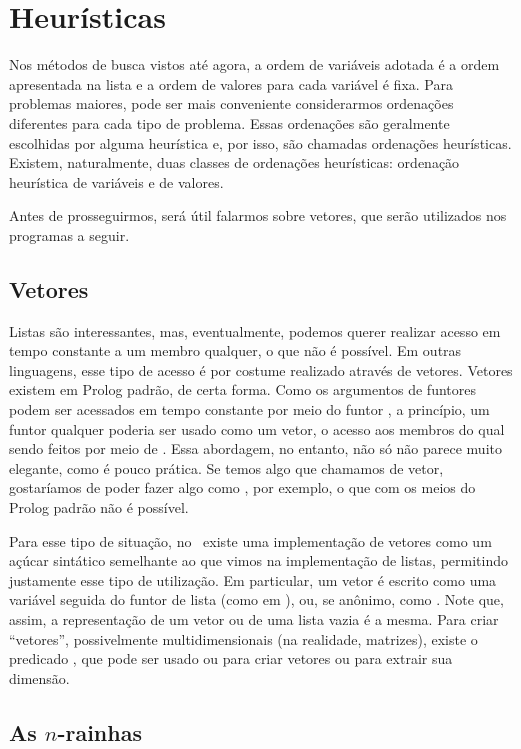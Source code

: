 \documentclass{article}
\begin{document}
\section{Heurísticas}

Nos métodos de busca vistos até agora, a ordem de variáveis adotada é a ordem apresentada na lista
e a ordem de valores para cada variável é fixa. Para problemas maiores, pode ser mais conveniente
considerarmos ordenações diferentes para cada tipo de problema. Essas ordenações são geralmente
escolhidas por alguma heurística e, por isso, são chamadas ordenações heurísticas. Existem,
naturalmente, duas classes de ordenações heurísticas: ordenação heurística de variáveis e de
valores.

Antes de prosseguirmos, será útil falarmos sobre vetores, que serão utilizados nos programas a
seguir.

\subsection{Vetores}

Listas são interessantes, mas, eventualmente, podemos querer realizar acesso em tempo constante a
um membro qualquer, o que não é possível. Em outras linguagens, esse tipo de acesso é por costume
realizado através de vetores. Vetores existem em Prolog padrão, de certa forma. Como os argumentos
de funtores podem ser acessados em tempo constante por meio do funtor , a princípio,
um funtor qualquer poderia ser usado como um vetor, o acesso aos membros do qual sendo feitos por meio de
. Essa abordagem, no entanto, não só não parece muito elegante, como é pouco prática.
Se temos algo que chamamos de vetor, gostaríamos de poder fazer algo como , por
exemplo, o que com os meios do Prolog padrão não é possível.

Para esse tipo de situação, no \eclipse\ existe uma implementação de vetores como um açúcar
sintático semelhante ao que vimos na implementação de listas, permitindo justamente esse tipo de
utilização. Em particular, um vetor é escrito como uma variável seguida do funtor de lista (como
em ), ou, se anônimo, como . Note que, assim, a representação de
um vetor ou de uma lista vazia é a mesma. Para criar ``vetores'', possivelmente multidimensionais
(na realidade, matrizes), existe o predicado , que pode ser usado ou para criar vetores
ou para extrair sua dimensão.

\subsection{As $n$-rainhas}
\end{document}
